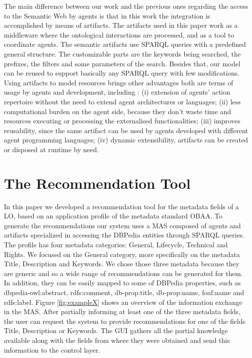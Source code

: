 \documentclass[a4paper,twoside]{article}
\begin{document}
The main difference between our work and the previous ones regarding the access to the Semantic Web by agents is that in this work the integration is accomplished by means of artifacts. The artifacts used in this paper work as a middleware where the ontological interactions are processed, and as a tool to coordinate agents. The semantic artifacts use SPARQL queries with a predefined general structure. The customizable parts are the keywords being searched, the prefixes, the filters and some parameters of the search. Besides that, our model can be reused to support basically any SPARQL query with few modifications. Using artifacts to model resources brings other advantages both are terms of usage by agents and development, including \cite{ref5}: (i) extension of agents' action repertoire without the  need to extend agent architectures or languages; (ii) less computational burden on the agent side, because they don't waste time and resources executing or processing the externalised functionalities; (iii) improves reusability, since the same artifact can be used by agents developed with different agent programming languages; (iv) dynamic extensibility, artifacts can be created or disposed at runtime by need.


\section{The Recommendation Tool}

\noindent In this paper we developed a recommendation tool for the metadata fields of a LO, based on an application profile of the metadata standard OBAA. To generate the recommendations our system uses a MAS composed of agents and artifacts specialized in accessing the DBPedia entities through SPARQL queries. The profile has four metadata categories: General, Lifecycle, Technical and Rights. We focused on the General category, more specifically on the metadata Title, Description and Keywords. We chose those three metadata because they are generic and so a wide range of recommendations can be generated for them. In addition, they can be easily mapped to some of DBPedia properties, such as dbpedia-owl:abstract,  rdfs:comment, db-prop:title, db-prop:name, foaf:name and rdfs:label.
Figure \ref{fig:exampleX} shows an overview of the information exchange in the MAS. After partially informing at least one of the three metadata fields, the user can request the system to provide recommendations for one of the fields Title, Description or Keywords. The GUI gathers all the partial knowledge available along with the fields from where they were obtained and send this information to the control layer.
\end{document}
